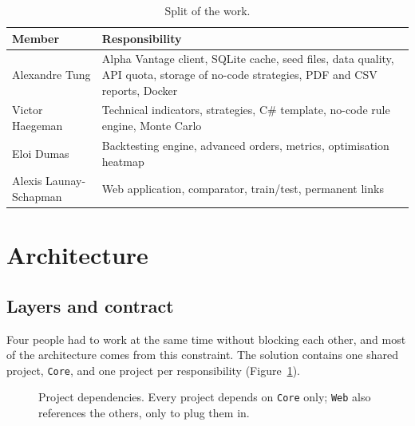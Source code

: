 \documentclass[11pt,a4paper]{article}
\newcommand{\code}[1]{\texttt{\small #1}}
\begin{document}
\begin{table}[H]
\centering\small
\begin{tabularx}{\textwidth}{lY}
\toprule
\textbf{Member} & \textbf{Responsibility} \\
\midrule
Alexandre Tung & Alpha Vantage client, SQLite cache, seed files, data quality, API quota, storage of no-code strategies, PDF and CSV reports, Docker \\
Victor Haegeman & Technical indicators, strategies, C\# template, no-code rule engine, Monte Carlo \\
Eloi Dumas & Backtesting engine, advanced orders, metrics, optimisation heatmap \\
Alexis Launay-Schapman & Web application, comparator, train/test, permanent links \\
\bottomrule
\end{tabularx}
\caption{Split of the work.}
\end{table}

\section{Architecture}
\label{sec:architecture}

\subsection{Layers and contract}

Four people had to work at the same time without blocking each other, and most of the architecture comes from this constraint. The solution contains one shared project, \code{Core}, and one project per responsibility (Figure~\ref{fig:layers}).

\begin{figure}[H]
\centering
{}
\caption{Project dependencies. Every project depends on \code{Core} only; \code{Web} also references the others, only to plug them in.}
\label{fig:layers}
\end{figure}
\end{document}
